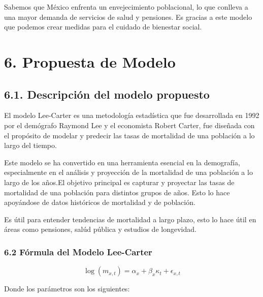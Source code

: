 \documentclass[
]{article}
\begin{document}
Sabemos que México enfrenta un envejecimiento poblacional, lo que
conlleva a una mayor demanda de servicios de salud y pensiones. Es
gracias a este modelo que podemos crear medidas para el cuidado de
bienestar social.

\clearpage

\hypertarget{propuesta-de-modelo}{%
\section{6. Propuesta de Modelo}\label{propuesta-de-modelo}}

\hypertarget{descripciuxf3n-del-modelo-propuesto}{%
\subsection{6.1. Descripción del modelo
propuesto}\label{descripciuxf3n-del-modelo-propuesto}}

El modelo Lee-Carter es una metodología estadística que fue desarrollada
en 1992 por el demógrafo Raymond Lee y el economista Robert Carter, fue
diseñada con el propósito de modelar y predecir las tasas de mortalidad
de una población a lo largo del tiempo.

Este modelo se ha convertido en una herramienta esencial en la
demografía, especialmente en el análisis y proyección de la mortalidad
de una población a lo largo de los años.El objetivo principal es
capturar y proyectar las tasas de mortalidad de una población para
distintos grupos de años. Esto lo hace apoyándose de datos históricos de
mortalidad y de población.

Es útil para entender tendencias de mortalidad a largo plazo, esto lo
hace útil en áreas como pensiones, salúd pública y estudios de
longevidad.

\hypertarget{fuxf3rmula-del-modelo-lee-carter}{%
\subsubsection{6.2 Fórmula del Modelo
Lee-Carter}\label{fuxf3rmula-del-modelo-lee-carter}}

\[
\log(m_{x,t}) = \alpha_x + \beta_x \kappa_t + \epsilon_{x,t}
\]

Donde los parámetros son los siguientes:
\end{document}
